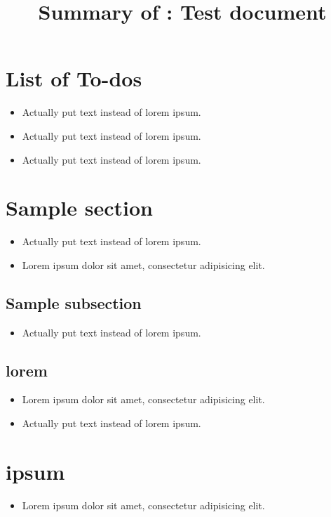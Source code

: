 \title{Summary of : Test document}
\maketitle

\section{List of To-dos}
    \begin{itemize}[noitemsep]
        \item {\color{red}Actually put text instead of lorem ipsum.}  %
        \item {\color{red}Actually put text instead of lorem ipsum.}  %
        \item {\color{red}Actually put text instead of lorem ipsum.}  %
    \end{itemize}

\section{Sample section}  %
    \begin{itemize}[noitemsep]
        \item {\color{red}Actually put text instead of lorem ipsum.}  %
        \item Lorem ipsum dolor sit amet, consectetur adipisicing elit.  %
    \end{itemize}
\subsection{Sample subsection}  %
    \begin{itemize}[noitemsep]
        \item {\color{red}Actually put text instead of lorem ipsum.}  %
    \end{itemize}
\subsection{lorem}  %
    \begin{itemize}[noitemsep]
        \item Lorem ipsum dolor sit amet, consectetur adipisicing elit.  %
        \item {\color{red}Actually put text instead of lorem ipsum.}  %
    \end{itemize}
\section{ipsum}  %
    \begin{itemize}[noitemsep]
        \item Lorem ipsum dolor sit amet, consectetur adipisicing elit.  %
    \end{itemize}

